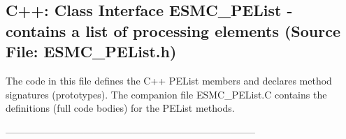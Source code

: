 
\parskip        0pt
\parindent      0pt
\baselineskip  11pt
 
\def\bv{\begin{verbatim}}
\def\ev{\end{verbatim}}
\def\be{\begin{equation}}
\def\ee{\end{equation}}
\def\bea{\begin{eqnarray}}
\def\eea{\end{eqnarray}}
\def\bi{\begin{itemize}}
\def\ei{\end{itemize}}
\def\bn{\begin{enumerate}}
\def\en{\end{enumerate}}
\def\bd{\begin{description}}
\def\ed{\end{description}}
\def\({\left (}
\def\){\right )}
\def\[{\left [}
\def\]{\right ]}
\def\<{\left  \langle}
\def\>{\right \rangle}
\def\cI{{\cal I}}
\def\diag{\mathop{\rm diag}}
\def\tr{\mathop{\rm tr}}


 
\subsection{C++:  Class Interface ESMC\_PEList - contains a list of processing elements (Source File: ESMC\_PEList.h)}


  
  
   The code in this file defines the C++ PEList members and declares method 
   signatures (prototypes).  The companion file ESMC\_PEList.C contains
   the definitions (full code bodies) for the PEList methods.
  
   
  
  -----------------------------------------------------------------------------
   
